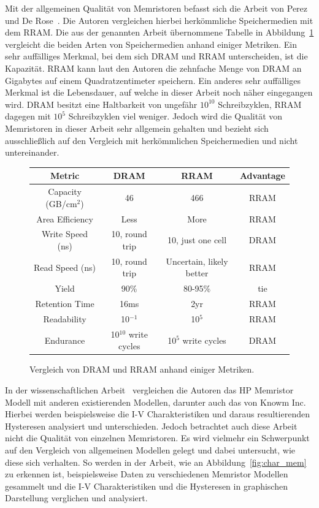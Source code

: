 Mit der allgemeinen Qualität von Memristoren befasst sich die Arbeit von Perez und De Rose~\cite{nonvolatile}. Die Autoren vergleichen hierbei herkömmliche Speichermedien mit dem RRAM. Die aus der genannten Arbeit übernommene Tabelle in Abbildung~\ref{tab:DRAM/RRAM} vergleicht die beiden Arten von Speichermedien anhand einiger Metriken. Ein sehr auffälliges Merkmal, bei dem sich DRAM und RRAM unterscheiden, ist die Kapazität. RRAM kann laut den Autoren die zehnfache Menge von DRAM an Gigabytes auf einem Quadratzentimeter speichern. Ein anderes sehr auffälliges Merkmal ist die Lebensdauer, auf welche in dieser Arbeit noch näher eingegangen wird. DRAM besitzt eine Haltbarkeit von ungefähr $10^{10}$ Schreibzyklen, RRAM dagegen mit $10^5$ Schreibzyklen viel weniger. Jedoch wird die Qualität von Memristoren in dieser Arbeit sehr allgemein gehalten und bezieht sich ausschließlich auf den Vergleich mit herkömmlichen Speichermedien und nicht untereinander.

\begin{figure}
  \centering
  \begin{tabular}{|c|c|c|c|}
    \hline\textbf{Metric} & \textbf{DRAM} & \textbf{RRAM} & \textbf{Advantage} \\\hline
    Capacity (GB/cm$^2$) & 46 & 466 & RRAM \\\hline
    Area Efficiency & Less & More & RRAM \\\hline
    Write Speed (ns) & 10, round trip & 10, just one cell & DRAM \\\hline
    Read Speed (ns) & 10, round trip & Uncertain, likely better & RRAM \\\hline
    Yield & 90\% & 80-95\% & tie \\\hline
    Retention Time & 16ms & 2yr & RRAM \\\hline
    Readability & 10$^{-1}$ & 10$^5$ & RRAM \\\hline
    Endurance & 10$^{10}$ write cycles & 10$^5$ write cycles & DRAM \\\hline
  \end{tabular}
  \caption{Vergleich von DRAM und RRAM anhand einiger Metriken.}
  \label{tab:DRAM/RRAM}
\end{figure}

In der wissenschaftlichen Arbeit~\cite{char_mem} vergleichen die Autoren das HP Memristor Modell mit anderen existierenden Modellen, darunter auch das von Knowm Inc. Hierbei werden beispielsweise die I-V Charakteristiken und daraus resultierenden Hysteresen analysiert und unterschieden. Jedoch betrachtet auch diese Arbeit nicht die Qualität von einzelnen Memristoren. Es wird vielmehr ein Schwerpunkt auf den Vergleich von allgemeinen Modellen gelegt und dabei untersucht, wie diese sich verhalten. So werden in der Arbeit, wie an Abbildung~\ref{fig:char_mem} zu erkennen ist, beispielsweise Daten zu verschiedenen Memristor Modellen gesammelt und die I-V Charakteristiken und die Hysteresen in graphischen Darstellung verglichen und analysiert.

